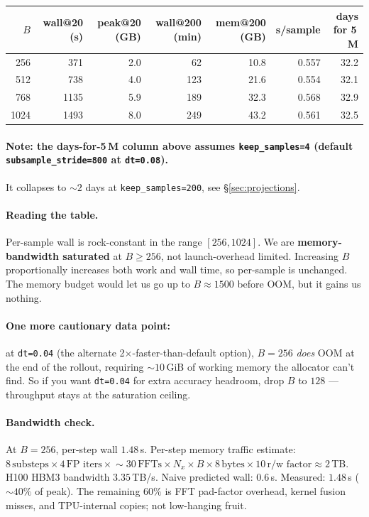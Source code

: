 \documentclass[11pt]{article}
\begin{document}
\begin{center}
\begin{tabular}{rrrrrrr}
\toprule
$B$ & wall@20 (s) & peak@20 (GB) & wall@200 (min) & mem@200 (GB) & s/sample & days for 5\,M \\
\midrule
256 & 371 & 2.0 & 62 & 10.8 & 0.557 & 32.2 \\
512 & 738 & 4.0 & 123 & 21.6 & 0.554 & 32.1 \\
768 & 1135 & 5.9 & 189 & 32.3 & 0.568 & 32.9 \\
1024 & 1493 & 8.0 & 249 & 43.2 & 0.561 & 32.5 \\
\bottomrule
\end{tabular}
\end{center}

\paragraph{Note: the days-for-5\,M column above assumes \texttt{keep\_samples=4}
(default \texttt{subsample\_stride=800} at \texttt{dt=0.08}).} It collapses to
$\sim\!2$ days at \texttt{keep\_samples=200}, see \S\ref{sec:projections}.

\paragraph{Reading the table.} Per-sample wall is rock-constant in the range
$[256, 1024]$. We are \textbf{memory-bandwidth saturated} at $B \ge 256$, not
launch-overhead limited. Increasing $B$ proportionally increases both work and wall
time, so per-sample is unchanged. The memory budget would let us go up to $B \approx
1500$ before OOM, but it gains us nothing.

\paragraph{One more cautionary data point:} at \texttt{dt=0.04} (the alternate
2$\times$-faster-than-default option), $B=256$ \emph{does} OOM at the end of the
rollout, requiring $\sim\!10$\,GiB of working memory the allocator can't find. So
if you want \texttt{dt=0.04} for extra accuracy headroom, drop $B$ to $128$ ---
throughput stays at the saturation ceiling.

\paragraph{Bandwidth check.} At $B=256$, per-step wall $1.48$\,s. Per-step memory
traffic estimate: $8\,\text{substeps}\!\times\!4\,\text{FP iters}\!\times\!\sim\!30\,\text{FFTs}\!\times\!N_x\!\times\!B\!\times\!8\,\text{bytes}\!\times\!10\,\text{r/w factor} \approx 2$\,TB.
H100 HBM3 bandwidth $3.35$\,TB/s. Naive predicted wall: $0.6$\,s. Measured: $1.48$\,s
($\sim 40\%$ of peak). The remaining $60\%$ is FFT pad-factor overhead, kernel
fusion misses, and TPU-internal copies; not low-hanging fruit.
\end{document}
